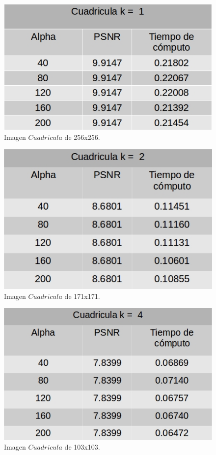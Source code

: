 \documentclass[a4paper]{article}
\begin{document}
\begin{figure}[H]
    \centering
    \includegraphics[scale=0.4]{imagenes/cua1.jpg}
    \caption{Imagen $Cuadricula$ de 256x256.}
	\label{cuade1}
    \end{figure}
    
\begin{figure}[H]
    \centering
    \includegraphics[scale=0.4]{imagenes/cua2.jpg}
    \caption{Imagen $Cuadricula$ de 171x171.}
	\label{cuade2}
    \end{figure}
    
    \begin{figure}[H]
    \centering
    \includegraphics[scale=0.4]{imagenes/cua4.jpg}
    \caption{Imagen $Cuadricula$ de 103x103.}
	\label{cuade3}
    \end{figure}
    
\end{document}
